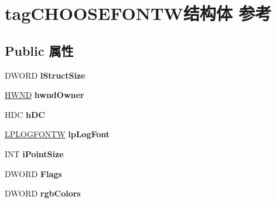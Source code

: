 \hypertarget{structtag_c_h_o_o_s_e_f_o_n_t_w}{}\section{tag\+C\+H\+O\+O\+S\+E\+F\+O\+N\+T\+W结构体 参考}
\label{structtag_c_h_o_o_s_e_f_o_n_t_w}
\subsection*{Public 属性}
\begin{DoxyCompactItemize}
\item 
\mbox{\label{structtag_c_h_o_o_s_e_f_o_n_t_w_a7651d7f1adafe37583d086940cd39891}} 
D\+W\+O\+RD {\bfseries l\+Struct\+Size}
\item 
\mbox{\label{structtag_c_h_o_o_s_e_f_o_n_t_w_aa7f73475c03f7362d31eef0aeac99595}} 
\hyperlink{interfacevoid}{H\+W\+ND} {\bfseries hwnd\+Owner}
\item 
\mbox{\label{structtag_c_h_o_o_s_e_f_o_n_t_w_aed3b89a517f88c5e72a40e558bafc962}} 
H\+DC {\bfseries h\+DC}
\item 
\mbox{\label{structtag_c_h_o_o_s_e_f_o_n_t_w_a4f2241060e6e3614e256a01044092fe7}} 
\hyperlink{structtag_l_o_g_f_o_n_t_w}{L\+P\+L\+O\+G\+F\+O\+N\+TW} {\bfseries lp\+Log\+Font}
\item 
\mbox{\label{structtag_c_h_o_o_s_e_f_o_n_t_w_a423a5d845f459d120f2d80bdd01d892d}} 
I\+NT {\bfseries i\+Point\+Size}
\item 
\mbox{\label{structtag_c_h_o_o_s_e_f_o_n_t_w_a183c4f45ba433c3a308e367867f67a7e}} 
D\+W\+O\+RD {\bfseries Flags}
\item 
\mbox{\label{structtag_c_h_o_o_s_e_f_o_n_t_w_aff1bc825246b4a882796f4f3868149fe}} 
D\+W\+O\+RD {\bfseries rgb\+Colors}
\item 
\mbox{\label{structtag_c_h_o_o_s_e_f_o_n_t_w_acf29146bfa32ac6fe860f20ea9ff3564}} 

\end{DoxyCompactItemize}
